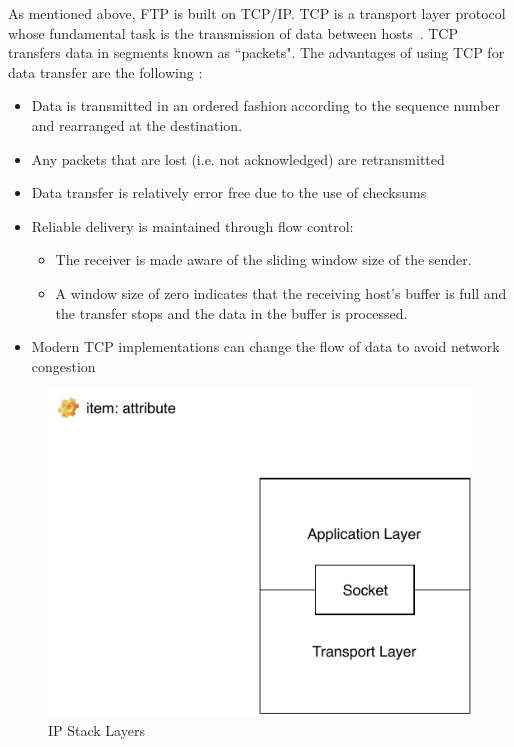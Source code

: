 \documentclass[journal, a4paper]{IEEEtran}
\begin{document}
As mentioned above, FTP is built on TCP/IP. TCP is a transport layer protocol whose fundamental task is the transmission of data between hosts~\cite{cn,mg}. TCP transfers data in segments known as ``packets". The advantages of using TCP for data transfer are the following \cite{tcpip}:

\begin{itemize}
\item Data is transmitted in an ordered fashion according to the sequence number and rearranged at the destination.
\item Any packets that are lost (i.e. not acknowledged) are retransmitted
\item Data transfer is relatively error free due to the use of checksums
\item Reliable delivery is maintained through flow control:
	\begin{itemize}
		\item The receiver is made aware of the sliding window size of the sender.
		\item A window size of zero indicates that the receiving host's buffer is full and the transfer stops and the data in the buffer is processed.
	\end{itemize}
\item Modern TCP implementations can change the flow of data to avoid network congestion
\end{itemize}

\begin{figure}[hbtp!]
	\centering
	\includegraphics[scale = 1.2]{socket}
	\caption{IP Stack Layers}
	\label {socket}
\end{figure}
\end{document}
